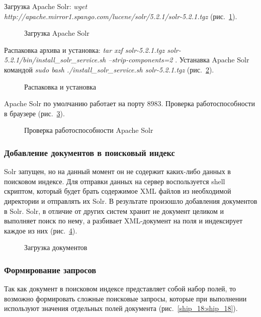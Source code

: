 Загрузка Apache Solr:
\textit
{
wget http://apache.mirror1.spango.com/lucene/solr/5.2.1/solr-5.2.1.tgz
} (рис.~\ref{ship_13:ship_13}).

\begin{figure}[h!]
\caption{Загрузка Apache Solr}
\label{ship_13:ship_13}
\end{figure}

Распаковка архива и установка: 
\textit
{
tar xzf solr-5.2.1.tgz solr-5.2.1/bin/install\_solr\_service.sh --strip-components=2
}.
Устанавка Apache Solr командой 
\textit
{
sudo bash ./install\_solr\_service.sh solr-5.2.1.tgz
} (рис.~\ref{ship_14:ship_14}).
\begin{figure}[h!]
\caption{Распаковка и установка}
\label{ship_14:ship_14}
\end{figure}

Apache Solr по умолчанию работает на порту 8983. Проверка работоспособности в браузере (рис.~\ref{ship_15:ship_15}).

\begin{figure}[h!]
\caption{Проверка работоспособности Apache Solr}
\label{ship_15:ship_15}
\end{figure}

\subsubsection{Добавление документов в поисковый индекс}

Solr запущен, но на данный момент он не содержит каких-либо данных в поисковом индексе. 
Для отправки данных на сервер воспользуется shell скриптом, который будет брать содержимое XML файлов из необходимой директории и отправлять их Solr. В результате произошло добавления документов в Solr. Solr, в отличие от других систем хранит не документ целиком и выполняет поиск по нему, а разбивает XML-документ на поля и индексирует каждое из них  (рис.~\ref{ship_16:ship_16}).

\begin{figure}[h!]
\caption{Загрузка документов}
\label{ship_16:ship_16}
\end{figure}

\subsubsection{Формирование запросов}
Так как документ в поисковом индексе представляет собой набор полей, то возможно формировать сложные поисковые запросы, которые при выполнении используют значения отдельных полей документа (рис.~\ref{ship_18:ship_18}). 

